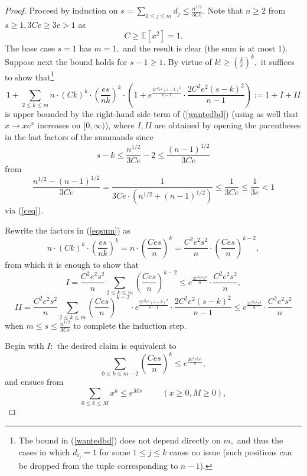 \documentclass[10pt,a4paper]{amsart}
\begin{document}
\begin{proof}
    Proceed by induction on \(s=\sum_{1 \leq j \leq m}{d_j} \leq \frac{n^{1/2}}{3Ce}.\) Note that \(n \geq 2\) from \(s \geq 1,3Ce \geq 3e>1\) as
    \begin{equation}\label{ceq}
        C \geq \mathbb{E}[x^2]=1.
    \end{equation}
    The base case \(s=1\) has \(m=1,\) and the result is clear (the sum is at most \(1\)). Suppose next the bound holds for \(s-1 \geq 1.\) By virtue of \(k! \geq (\frac{k}{e})^k,\) it suffices to show that\footnote{The bound in (\ref{wantedbd}) does  not depend directly on \(m,\) and thus the cases in which \(d_{i_j}=1\) for some \(1 \leq j \leq k\) cause no issue (such positions can be dropped from the tuple corresponding to \(n-1\)).}
    \begin{equation}\label{eqsum}
        1+\sum_{2 \leq k \leq m}{n \cdot (Ck)^{k} \cdot (\frac{es}{nk})^k \cdot (1+e^{\frac{2C^2e^2(s-k)^2}{n-1}} \cdot \frac{2C^2e^2(s-k)^2}{n-1})}:=1+I+II
    \end{equation}
    is upper bounded by the right-hand side term of (\ref{wantedbd}) (using as well that \(x \to xe^{x}\) increases on \([0,\infty)\)), where \(I,II\) are obtained by opening the parentheses in the last factors of the summands since 
     \[s-k \leq \frac{n^{1/2}}{3Ce}-2 \leq \frac{(n-1)^{1/2}}{3Ce}\] 
     from 
     \[\frac{n^{1/2}-(n-1)^{1/2}}{3Ce}=\frac{1}{3Ce \cdot (n^{1/2}+(n-1)^{1/2})} \leq \frac{1}{3Ce} \leq \frac{1}{3e}<1\]
     via (\ref{ceq}). 
     \par
     Rewrite the factors in (\ref{eqsum}) as
    \[n \cdot (Ck)^{k} \cdot (\frac{es}{nk})^k=n \cdot (\frac{Ces}{n})^{k}=\frac{C^2e^2s^2}{n} \cdot (\frac{Ces}{n})^{k-2},\]
    from which it is enough to show that
    \[I=\frac{C^2e^2s^2}{n} \sum_{2 \leq k \leq m}{(\frac{Ces}{n})^{k-2}} \leq e^{\frac{2C^2e^2s^2}{n}} \cdot \frac{C^2e^2s^2}{n},\]
    \[II=\frac{C^2e^2s^2}{n} \sum_{2 \leq k \leq m}{(\frac{Ces}{n})^{k-2} \cdot e^{\frac{2C^2e^2(s-k)^2}{n-1}} \cdot \frac{2C^2e^2(s-k)^2}{n-1}} \leq e^{\frac{2C^2e^2s^2}{n}} \cdot \frac{C^2e^2s^2}{n}\]
    when \(m \leq s \leq \frac{n^{1/2}}{3Ce}\) to complete the induction step. %
    \par
    Begin with \(I:\) the desired claim is equivalent to
    \[\sum_{0 \leq k \leq m-2}{(\frac{Ces}{n})^{k}} \leq e^{\frac{2C^2e^2s^2}{n}},\]
    and ensues from
    \begin{equation}\label{helper}
        \sum_{0 \leq k \leq M}{x^k} \leq e^{Mx} \hspace{1cm} (x \geq 0,M \geq 0),

\end{equation}
\end{proof}
\end{document}
